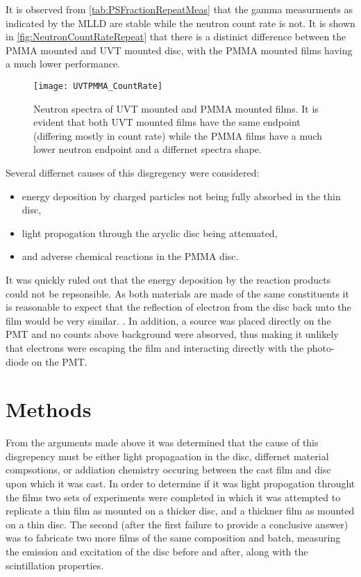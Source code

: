 \documentclass[draftcls,onecolumn]{IEEEtran}
\begin{document}
It is observed from \autoref{tab:PSFractionRepeatMeas} that the gamma measurments as indicated by the MLLD are stable while the neutron count rate is not. 
It is shown in \autoref{fig:NeutronCountRateRepeat} that there is a distinict difference between the PMMA mounted and UVT mounted disc, with the PMMA mounted films having a much lower performance.

\begin{figure}
  \centering
  \texttt{[image: UVTPMMA\_CountRate]}
  \caption[Neutron Spectra of UVT mounted and PMMA mounted films]{Neutron spectra of UVT mounted and PMMA mounted films.  It is evident that both UVT mounted films have the same endpoint (differing mostly in count rate) while the PMMA films have a much lower neutron endpoint and a differnet spectra shape.}
  \label{fig:NeutronCountRateRepeat}
\end{figure}
Several differnet causes of this disgregency were considered:
\begin{itemize}
  \item energy deposition by charged particles not being fully absorbed in the thin disc,
  \item light propogation through the aryclic disc being attenuated,
  \item and adverse chemical reactions in the PMMA disc.
\end{itemize}

It was quickly ruled out that the energy deposition by the reaction products could not be repsonsible.
As both materials are made of the same constituents it is reasonable to expect that the reflection of electron from the disc back unto the film would be very similar.
.
In addition, a  source was placed directly on the PMT and no counts above background were absorved, thus making it unlikely that electrons were escaping the film and interacting directly with the photo-diode on the PMT.

\section{Methods}
From the arguments made above it was determined that the cause of this disgrepency must be either light propagaation in the disc, differnet material compsotions, or addiation chemistry occuring between the cast film and disc upon which it was cast.
In order to determine if it was light propogation throught the films two sets of experiments were completed in which it was attempted to replicate a thin film as mounted on a thicker disc, and a thickner film as mounted on a thin disc.
The second (after the first failure to provide a conclusive answer) was to fabricate two more films of the same composition and batch, measuring the emission and excitation of the disc before and after, along with the scintillation properties.
\end{document}

